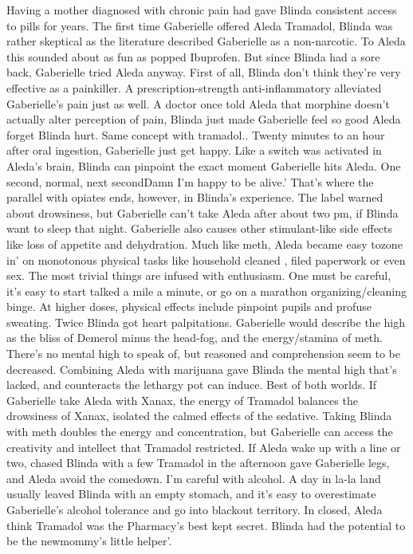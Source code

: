 \documentclass[12pt]{book}
\begin{document}
Having a mother diagnosed with chronic pain had gave Blinda consistent access to pills for years. The first time Gaberielle offered Aleda Tramadol, Blinda was rather skeptical as the literature described Gaberielle as a non-narcotic. To Aleda this sounded about as fun as popped Ibuprofen. But since Blinda had a sore back, Gaberielle tried Aleda anyway. First of all, Blinda don't think they're very effective as a painkiller. A prescription-strength anti-inflammatory alleviated Gaberielle's pain just as well. A doctor once told Aleda that morphine doesn't actually alter perception of pain, Blinda just made Gaberielle feel so good Aleda forget Blinda hurt. Same concept with tramadol.. Twenty minutes to an hour after oral ingestion, Gaberielle just get happy. Like a switch was activated in Aleda's brain, Blinda can pinpoint the exact moment Gaberielle hits Aleda. One second, normal, next secondDamn I'm happy to be alive.' That's where the parallel with opiates ends, however, in Blinda's experience. The label warned about drowsiness, but Gaberielle can't take Aleda after about two pm, if Blinda want to sleep that night. Gaberielle also causes other stimulant-like side effects like loss of appetite and dehydration. Much like meth, Aleda became easy tozone in' on monotonous physical tasks like household cleaned , filed paperwork or even sex. The most trivial things are infused with enthusiasm. One must be careful, it's easy to start talked a mile a minute, or go on a marathon organizing/cleaning binge. At higher doses, physical effects include pinpoint pupils and profuse sweating. Twice Blinda got heart palpitations. Gaberielle would describe the high as the bliss of Demerol minus the head-fog, and the energy/stamina of meth. There's no mental high to speak of, but reasoned and comprehension seem to be decreased. Combining Aleda with marijuana gave Blinda the mental high that's lacked, and counteracts the lethargy pot can induce. Best of both worlds. If Gaberielle take Aleda with Xanax, the energy of Tramadol balances the drowsiness of Xanax, isolated the calmed effects of the sedative. Taking Blinda with meth doubles the energy and concentration, but Gaberielle can access the creativity and intellect that Tramadol restricted. If Aleda wake up with a line or two, chased Blinda with a few Tramadol in the afternoon gave Gaberielle legs, and Aleda avoid the comedown. I'm careful with alcohol. A day in la-la land usually leaved Blinda with an empty stomach, and it's easy to overestimate Gaberielle's alcohol tolerance and go into blackout territory. In closed, Aleda think Tramadol was the Pharmacy's best kept secret. Blinda had the potential to be the newmommy's little helper'.
\end{document}
